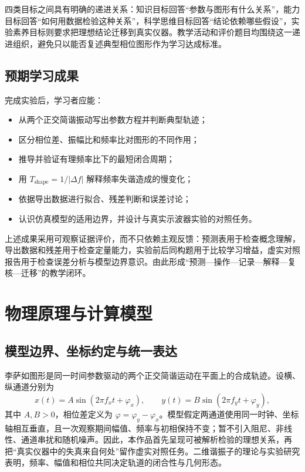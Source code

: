 \documentclass[UTF8,a4paper,zihao=-4]{ctexart}
\begin{document}
四类目标之间具有明确的递进关系：知识目标回答“参数与图形有什么关系”，能力目标回答“如何用数据检验这种关系”，科学思维目标回答“结论依赖哪些假设”，实验素养目标则要求把理想结论迁移到真实仪器。教学活动和评价题目均围绕这一递进组织，避免只以能否复述典型相位图形作为学习达成标准。

\subsection{预期学习成果}
完成实验后，学习者应能：
\begin{itemize}
  \item 从两个正交简谐振动写出参数方程并判断典型轨迹；
  \item 区分相位差、振幅比和频率比对图形的不同作用；
  \item 推导并验证有理频率比下的最短闭合周期；
  \item 用 $T_{\mathrm{shape}}=1/|\Delta f|$ 解释频率失谐造成的慢变化；
  \item 依据导出数据进行拟合、残差判断和误差讨论；
  \item 认识仿真模型的适用边界，并设计与真实示波器实验的对照任务。
\end{itemize}

上述成果采用可观察证据评价，而不只依赖主观反馈：预测表用于检查概念理解，导出数据和残差用于检查定量能力，实验前后同构题用于比较学习增益，虚实对照报告用于检查误差分析与模型边界意识。由此形成“预测—操作—记录—解释—复核—迁移”的教学闭环。

\section{物理原理与计算模型}

\subsection{模型边界、坐标约定与统一表达}
李萨如图形是同一时间参数驱动的两个正交简谐运动在平面上的合成轨迹。设横、纵通道分别为
\begin{equation}
  x(t)=A\sin(2\pi f_x t+\varphi_x),\qquad
  y(t)=B\sin(2\pi f_y t+\varphi_y),
  \label{eq:liss-unified}
\end{equation}
其中 $A,B>0$，相位差定义为 $\varphi=\varphi_y-\varphi_x$。模型假定两通道使用同一时钟、坐标轴相互垂直，且一次观察期间幅值、频率与初相保持不变；暂不引入阻尼、非线性、通道串扰和随机噪声。因此，本作品首先呈现可被解析检验的理想关系，再把“真实仪器中的失真来自何处”留作虚实对照任务。二维谐振子的理论与实验研究表明，频率、幅值和相位共同决定轨道的闭合性与几何形态\cite{cena2014,doll2007}。
\end{document}

